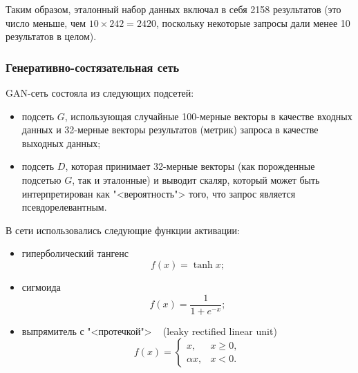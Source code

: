Таким образом, эталонный набор данных включал в себя 2158 результатов
(это число меньше, чем $10\times242=2420$, поскольку некоторые запросы дали менее 10 результатов в целом).

\subsubsection{Генеративно-состязательная сеть}
\label{lab:gan-grammar}
GAN-сеть состояла из следующих подсетей:
\begin{itemize}
    \item подсеть $G$, использующая случайные 100-мерные векторы в качестве входных данных 
    и 32-мерные векторы результатов (метрик) запроса в качестве выходных данных;
    \item подсеть $D$, которая принимает 32-мерные векторы (как порожденные подсетью $G$, так и эталонные) и выводит скаляр, 
    который может быть интерпретирован как "<вероятность"> того, что запрос является псевдорелевантным.
\end{itemize}

В сети использовались следующие функции активации:
\begin{itemize}
    \item гиперболический тангенс
    \begin{equation}
        f(x) = \tanh x;
    \end{equation}
    \item сигмоида
    \begin{equation}
        f(x) = \frac{1}{1+e^{-x}};
    \end{equation}
    \item выпрямитель с "<протечкой"> ~\cite{DBLP:journals/corr/XuWCL15} (leaky rectified linear unit)
    \begin{equation}
        f(x) = \begin{cases}
            x, & x \geqslant 0, \\
            \alpha x, & x < 0.
        \end{cases}
    \end{equation}
\end{itemize}

